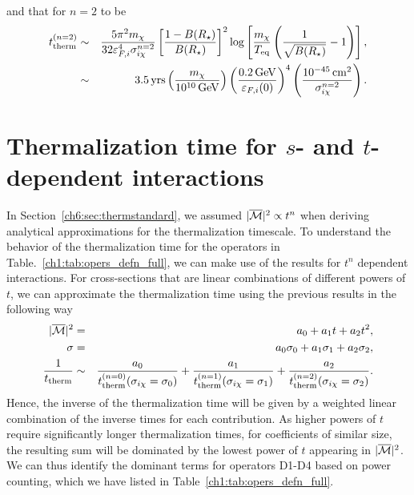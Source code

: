 and that for $n=2$ to be
\begin{eqnarray}
    t_{\rm therm}^{(n=2)} &\sim& \frac{5 \pi^2 m_\chi}{ 32 \varepsilon_{F,i}^4\sigma_{i\chi}^{n=2}} \left[\frac{1-B(R_\star)}{B(R_\star)}\right]^2 \log\left[\frac{m_\chi}{T_{\rm eq}}\left(\frac{1}{\sqrt{B(R_\star)}}-1\right)\right],\\
    &\sim& 3.5 {\rm \,yrs} \left( \frac{m_\chi}{10^{10} {\rm \,GeV}}\right) \left(\frac{0.2{\rm \,GeV}}{\varepsilon_{F,i}(0)}\right)^{4}\left(\frac{10^{-45}{\rm \,cm}^2}{\sigma_{i\chi}^{n=2}}\right). 
\end{eqnarray}







\section[Thermalization time for {\it s}- and {\it t}-dependent interactions]{Thermalization time for $s$- and $t$-dependent interactions}
\label{app:sec:sdeptherm}


In Section~\ref{ch6:sec:thermstandard}, we assumed $|\overline{\mathcal M}|^2\propto t^n$ when deriving analytical approximations for the thermalization timescale. To understand the behavior of the thermalization time for the operators in Table.~\ref{ch1:tab:opers_defn_full}, we can make use of the results for $t^n$ dependent interactions. For cross-sections that are linear combinations of different powers of $t$, we can approximate the thermalization time using the previous results in the following way
\begin{eqnarray}
|\overline{\mathcal M}|^2 &=& a_0 + a_1 t + a_2 t^2,\\
\sigma &=& a_0\sigma_0 + a_1 \sigma_1 + a_2 \sigma_2,\\
\frac{1}{t_{\rm therm}} &\sim& \frac{a_0}{ t_{\rm therm}^{(n=0)}(\sigma_{i\chi}=\sigma_0)} + \frac{a_1} {t_{\rm therm}^{(n=1)}(\sigma_{i\chi}=\sigma_1)} 
 + \frac{a_2}{  t_{\rm therm}^{(n=2)}(\sigma_{i\chi}=\sigma_2)}. 
\label{app:eq:ttherm_weighted}
\end{eqnarray}
Hence, the inverse of the thermalization time will be given by a weighted linear combination of the inverse times for each contribution. As higher powers of $t$ require significantly longer thermalization times, for coefficients of similar size, the resulting sum will be dominated by the lowest power of $t$ appearing in  $|\overline{\mathcal M}|^2$.  We can thus identify the dominant terms for operators D1-D4  based on power counting, which we have listed in Table~\ref{ch1:tab:opers_defn_full}.

